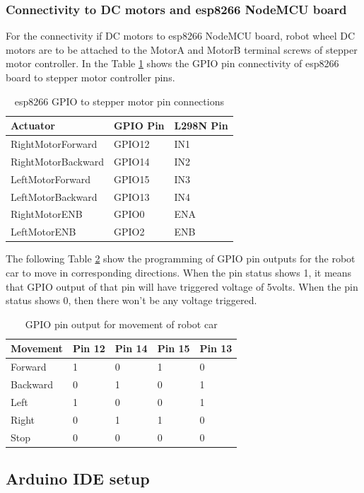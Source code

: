 \documentclass[sigconf]{acmart}
\begin{document}
\subsubsection{Connectivity to DC motors and esp8266 NodeMCU board}
For the connectivity if DC motors to esp8266 NodeMCU board, robot wheel 
DC motors are to be attached to the MotorA and MotorB terminal screws 
of stepper motor controller. In the Table \ref{T:pinlayout} shows the 
GPIO pin connectivity of esp8266 board to stepper motor controller pins.


\begin{table}[htb]
\caption{esp8266 GPIO to stepper motor pin connections}\label{T:pinlayout}
\begin{tabular}{lll}
Actuator & GPIO Pin & L298N Pin \\
\hline
    RightMotorForward & GPIO12 & IN1 \\
    RightMotorBackward & GPIO14 & IN2 \\
    LeftMotorForward & GPIO15 & IN3 \\
    LeftMotorBackward & GPIO13 & IN4 \\
    RightMotorENB & GPIO0 & ENA \\
    LeftMotorENB & GPIO2 & ENB \\
\end{tabular}
\end{table}

The following Table \ref{T:gpiooutput} show the programming of GPIO pin 
outputs for the robot car to move in corresponding directions. When the 
pin status shows 1, it means that GPIO output of that pin will have 
triggered voltage of 5volts. When the pin status shows 0, then there 
won't be any voltage triggered.

\begin{table}[htb]
\caption{GPIO pin output for movement of robot car}\label{T:gpiooutput}
\begin{tabular}{lllll}
Movement & Pin 12 & Pin 14 & Pin 15 & Pin 13 \\
\hline
Forward & 1 & 0 & 1 & 0 \\ 
Backward & 0 & 1 & 0 & 1 \\
Left & 1 & 0 & 0 & 1 \\
Right & 0 & 1 & 1 & 0 \\
Stop  & 0 & 0 & 0 & 0 \\
\end{tabular}
\end{table}

\subsection{Arduino IDE setup}
\end{document}
